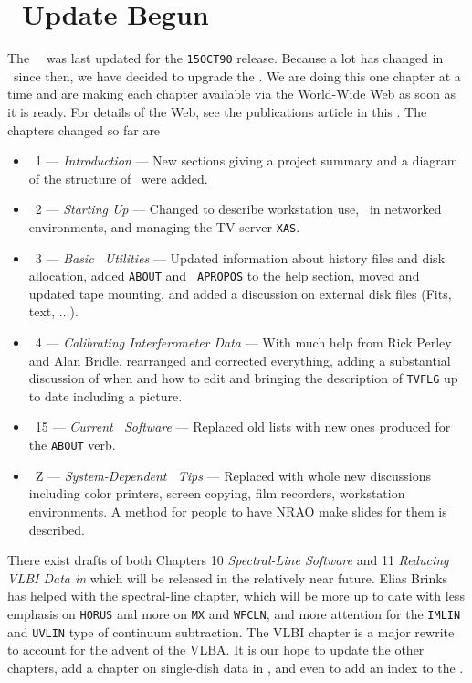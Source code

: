 \section{\Cookbook\ Update Begun}

     The \AIPS\ \Cookbook\ was last updated for the {\tt 15OCT90}
release.  Because a lot has changed in \AIPS\ since then, we have
decided to upgrade the \Cookbook.  We are doing this one chapter at a
time and are making each chapter available via the World-Wide Web as
soon as it is ready.  For details of the Web, see the publications
article in this \Aipsletter.  The chapters changed so far are
\vspace{-8pt}
\begin{itemize}
\item\ 1 --- {\it Introduction} --- New sections giving a project
   summary and a diagram of the structure of \AIPS\ were added.
\item\ 2 --- {\it Starting Up \AIPS} ---  Changed to describe
   workstation use, \AIPS\ in networked environments, and managing the
   TV server {\tt XAS}.
\item\ 3 --- {\it Basic \AIPS\ Utilities} --- Updated information about
   history files and disk allocation, added {\tt ABOUT} and {\tt
   APROPOS} to the help section, moved and updated tape mounting, and
   added a discussion on external disk files (Fits, text, $\ldots$).
\item\ 4 --- {\it Calibrating Interferometer Data} --- With much help
   from Rick Perley and Alan Bridle, rearranged and corrected
   everything, adding a substantial discussion of when and how to edit
   and bringing the description of {\tt TVFLG} up to date including a
   picture.
\item\ 15 --- {\it Current \AIPS\ Software} --- Replaced old lists with
   new ones produced for the {\tt ABOUT} verb.
\item\ Z --- {\it System-Dependent \AIPS\ Tips} --- Replaced with whole
   new discussions including color printers, screen copying, film
   recorders, workstation environments.  A method for people to have
   NRAO make slides for them is described.
\end{itemize}
\vspace{-8pt}
\noindent There exist drafts of both Chapters 10 {\it Spectral-Line
Software} and 11 {\it Reducing VLBI Data in \AIPS} which will be
released in the relatively near future.  Elias Brinks has helped with
the spectral-line chapter, which will be more up to date with less
emphasis on {\tt HORUS} and more on {\tt MX} and {\tt WFCLN}, and more
attention for the {\tt IMLIN} and {\tt UVLIN} type of continuum
subtraction.  The VLBI chapter is a major rewrite to account for the
advent of the \hbox{VLBA}.  It is our hope to update the other
chapters, add a chapter on single-dish data in \AIPS, and even to add
an index to the \Cookbook.
\eject


